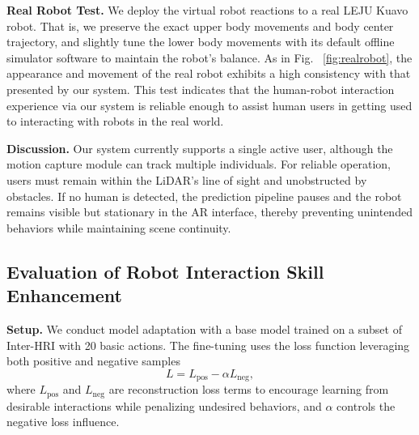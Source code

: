 \noindent\textbf{Real Robot Test.} %
We deploy the virtual robot reactions to a real LEJU Kuavo robot. That is, we preserve the exact upper body movements and body center trajectory, and slightly tune the lower body movements with its default offline simulator software to maintain the robot's balance. As in Fig. ~\ref{fig:realrobot}, the appearance and movement of the real robot exhibits a high consistency with that presented by our system. This test indicates that the human-robot interaction experience via our system is reliable enough to assist human users in getting used to interacting with robots in the real world.

\noindent\textbf{Discussion.} Our system currently supports a single active user, although the motion capture module can track multiple individuals. For reliable operation, users must remain within the LiDAR’s line of sight and unobstructed by obstacles. If no human is detected, the prediction pipeline pauses and the robot remains visible but stationary in the AR interface, thereby preventing unintended behaviors while maintaining scene continuity.


\subsection{Evaluation of Robot Interaction Skill Enhancement}
\label{eval3}

\noindent\textbf{Setup.} We conduct model adaptation with a base model trained on a subset of Inter-HRI with 20 basic actions. The fine-tuning uses the loss function leveraging both positive and negative samples 
\[
L = L_{\text{pos}} - \alpha L_{\text{neg}},
\]
where $L_{\text{pos}}$  and $L_{\text{neg}}$ are reconstruction loss terms to encourage learning from desirable interactions while penalizing undesired behaviors, and $\alpha$ controls the negative loss influence.


